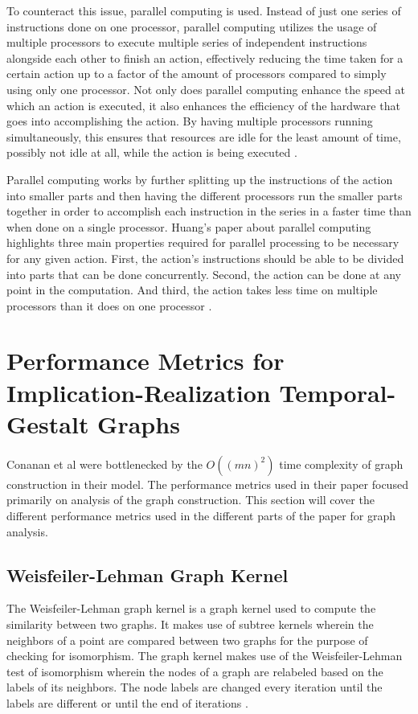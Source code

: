 To counteract this issue, parallel computing is used. Instead of just one series of instructions done on one processor, parallel computing utilizes the usage of multiple processors to execute multiple series of independent instructions alongside each other to finish an action, effectively reducing the time taken for a certain action up to a factor of the amount of processors compared to simply using only one processor. Not only does parallel computing enhance the speed at which an action is executed, it also enhances the efficiency of the hardware that goes into accomplishing the action. By having multiple processors running simultaneously, this ensures that resources are idle for the least amount of time, possibly not idle at all, while the action is being executed \cite{AdefemiParallelization}.

Parallel computing works by further splitting up the instructions of the action into smaller parts and then having the different processors run the smaller parts together in order to accomplish each instruction in the series in a faster time than when done on a single processor. Huang’s paper about parallel computing highlights three main properties required for parallel processing to be necessary for any given action. First, the action’s instructions should be able to be divided into parts that can be done concurrently. Second, the action can be done at any point in the computation. And third, the action takes less time on multiple processors than it does on one processor \cite{HuangParallelComputing}.


\section {Performance Metrics for Implication-Realization Temporal-Gestalt Graphs}
Conanan et al were bottlenecked by the $O((mn)^2)$ time complexity of graph construction in their model. The performance metrics used in their paper focused primarily on analysis of the graph construction. This section will cover the different performance metrics used in the different parts of the paper for graph analysis.

\subsection{Weisfeiler-Lehman Graph Kernel}
The Weisfeiler-Lehman graph kernel is a graph kernel used to compute the similarity between two graphs. It makes use of subtree kernels wherein the neighbors of a point are compared between two graphs for the purpose of checking for isomorphism. The graph kernel makes use of the Weisfeiler-Lehman test of isomorphism wherein the nodes of a graph are relabeled based on the labels of its neighbors.  The node labels are changed every iteration until the labels are different or until the end of iterations \cite{weisfeiler-lehman}.

